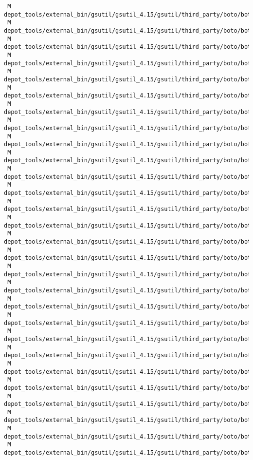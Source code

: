 \documentclass{article}
\begin{document}
\begin{verbatim}
 M depot_tools/external_bin/gsutil/gsutil_4.15/gsutil/third_party/boto/boto/glacier/response.py
 M depot_tools/external_bin/gsutil/gsutil_4.15/gsutil/third_party/boto/boto/gs/bucket.py
 M depot_tools/external_bin/gsutil/gsutil_4.15/gsutil/third_party/boto/boto/gs/resumable_upload_handler.py
 M depot_tools/external_bin/gsutil/gsutil_4.15/gsutil/third_party/boto/boto/iam/connection.py
 M depot_tools/external_bin/gsutil/gsutil_4.15/gsutil/third_party/boto/boto/manage/cmdshell.py
 M depot_tools/external_bin/gsutil/gsutil_4.15/gsutil/third_party/boto/boto/manage/propget.py
 M depot_tools/external_bin/gsutil/gsutil_4.15/gsutil/third_party/boto/boto/manage/server.py
 M depot_tools/external_bin/gsutil/gsutil_4.15/gsutil/third_party/boto/boto/manage/test_manage.py
 M depot_tools/external_bin/gsutil/gsutil_4.15/gsutil/third_party/boto/boto/manage/volume.py
 M depot_tools/external_bin/gsutil/gsutil_4.15/gsutil/third_party/boto/boto/mashups/interactive.py
 M depot_tools/external_bin/gsutil/gsutil_4.15/gsutil/third_party/boto/boto/mashups/iobject.py
 M depot_tools/external_bin/gsutil/gsutil_4.15/gsutil/third_party/boto/boto/mashups/order.py
 M depot_tools/external_bin/gsutil/gsutil_4.15/gsutil/third_party/boto/boto/mashups/server.py
 M depot_tools/external_bin/gsutil/gsutil_4.15/gsutil/third_party/boto/boto/mturk/connection.py
 M depot_tools/external_bin/gsutil/gsutil_4.15/gsutil/third_party/boto/boto/mturk/question.py
 M depot_tools/external_bin/gsutil/gsutil_4.15/gsutil/third_party/boto/boto/mws/connection.py
 M depot_tools/external_bin/gsutil/gsutil_4.15/gsutil/third_party/boto/boto/mws/exception.py
 M depot_tools/external_bin/gsutil/gsutil_4.15/gsutil/third_party/boto/boto/mws/response.py
 M depot_tools/external_bin/gsutil/gsutil_4.15/gsutil/third_party/boto/boto/pyami/config.py
 M depot_tools/external_bin/gsutil/gsutil_4.15/gsutil/third_party/boto/boto/pyami/copybot.py
 M depot_tools/external_bin/gsutil/gsutil_4.15/gsutil/third_party/boto/boto/pyami/installers/ubuntu/installer.py
 M depot_tools/external_bin/gsutil/gsutil_4.15/gsutil/third_party/boto/boto/pyami/launch_ami.py
 M depot_tools/external_bin/gsutil/gsutil_4.15/gsutil/third_party/boto/boto/rds/__init__.py
 M depot_tools/external_bin/gsutil/gsutil_4.15/gsutil/third_party/boto/boto/rds/parametergroup.py
 M depot_tools/external_bin/gsutil/gsutil_4.15/gsutil/third_party/boto/boto/regioninfo.py
 M depot_tools/external_bin/gsutil/gsutil_4.15/gsutil/third_party/boto/boto/requestlog.py
 M depot_tools/external_bin/gsutil/gsutil_4.15/gsutil/third_party/boto/boto/resultset.py
 M depot_tools/external_bin/gsutil/gsutil_4.15/gsutil/third_party/boto/boto/roboto/awsqueryrequest.py

\end{verbatim}
\end{document}
